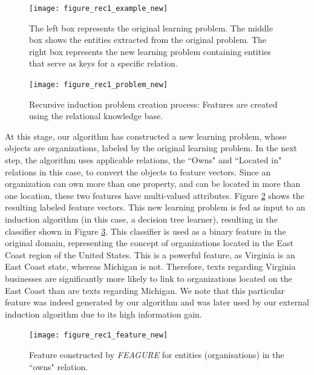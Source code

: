 \documentclass[twoside,11pt]{article}
\theoremstyle{definition}
\begin{document}
\begin{figure}[!h]
	\centering
	\texttt{[image: figure\_rec1\_example\_new]}
	\caption{The left box represents the original learning problem. The middle box shows the entities extracted from the original problem. The right box represents the new learning problem containing entities that serve as keys for a specific relation.}
	\label{fig:figure_rec1_example}
\end{figure}

\begin{figure}[!h]
	\centering
	\texttt{[image: figure\_rec1\_problem\_new]}
	\caption{Recursive induction problem creation process: Features are created using the relational knowledge base.}
	\label{fig:figure_rec1_problem}
\end{figure}

At this stage, our algorithm has constructed a new learning problem, whose objects are organizations, labeled by the original learning problem. 
In the next step, the algorithm uses applicable relations, the ``Owns" and ``Located in" relations in this case, to convert the objects to feature vectors.
Since an organization can own more than one property, and can be located in more than one location, these two features have multi-valued attributes. Figure \ref{fig:figure_rec1_problem} shows the resulting labeled feature vectors.
This new learning problem is fed as input to an induction algorithm (in this case, a decision tree learner), resulting in the classifier shown in Figure \ref{fig:feature_eastcoast_rel}. This classifier is used as a binary feature in the original domain, representing the concept of organizations located in the East Coast region of the United States.
This is a powerful feature, as Virginia is an East Coast state, whereas Michigan is not. Therefore, texts regarding Virginia businesses are significantly more likely to link to organizations located on the East Coast than are texts regarding Michigan. We note that this particular feature was indeed generated by our algorithm and was later used by our external induction algorithm due to its high information gain.

\begin{figure}[!h]
	\centering
	\texttt{[image: figure\_rec1\_feature\_new]}
	\caption{Feature constructed by \emph{FEAGURE} for entities (organisations) in the ``owns" relation.}
	\label{fig:feature_eastcoast_rel}
\end{figure}
\end{document}
